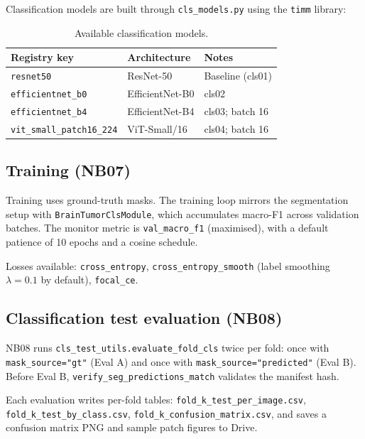 \documentclass[12pt,a4paper]{article}
\begin{document}
Classification models are built through \texttt{cls\_models.py} using the
\texttt{timm} library:

\begin{table}[h]
  \centering
  \caption{Available classification models.}
  \begin{tabular}{L{4cm} L{5cm} L{5cm}}
    \toprule
    \textbf{Registry key} & \textbf{Architecture} & \textbf{Notes} \\
    \midrule
    \texttt{resnet50}                 & ResNet-50           & Baseline (cls01) \\
    \texttt{efficientnet\_b0}         & EfficientNet-B0     & cls02 \\
    \texttt{efficientnet\_b4}         & EfficientNet-B4     & cls03; batch 16 \\
    \texttt{vit\_small\_patch16\_224} & ViT-Small/16        & cls04; batch 16 \\
    \bottomrule
  \end{tabular}
\end{table}

\subsection{Training (NB07)}

Training uses ground-truth masks.  The training loop mirrors the segmentation
setup with \texttt{BrainTumorClsModule}, which accumulates macro-F1 across
validation batches.  The monitor metric is \texttt{val\_macro\_f1}
(maximised), with a default patience of 10 epochs and a cosine schedule.

Losses available: \texttt{cross\_entropy},
\texttt{cross\_entropy\_smooth} (label smoothing $\lambda=0.1$ by default),
\texttt{focal\_ce}.

\subsection{Classification test evaluation (NB08)}

NB08 runs \texttt{cls\_test\_utils.evaluate\_fold\_cls} twice per fold:
once with \texttt{mask\_source="gt"} (Eval A) and once with
\texttt{mask\_source="predicted"} (Eval B).  Before Eval B,
\texttt{verify\_seg\_predictions\_match} validates the manifest hash.

Each evaluation writes per-fold tables:
\texttt{fold\_k\_test\_per\_image.csv},
\texttt{fold\_k\_test\_by\_class.csv},
\texttt{fold\_k\_confusion\_matrix.csv},
and saves a confusion matrix PNG and sample patch figures to Drive.
\end{document}
